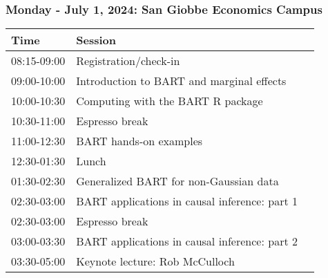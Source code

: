 \documentclass[11pt,pdftex,dvipsnames,usenames,helvetica]{beamer}
\begin{document}
\boldmath

\begin{comment}
\begin{frame}[fragile]
\frametitle{High-level outline: Bayesian Ensemble Learning}

\begin{enumerate}
\item Bayes' Theorem and Bayesianism
\item Machine/Statistical Learning and Ensembles with Binary Trees
\item Bayesian Additive Regression Trees: BART
\item Heteroskedastic BART 
\item R and BART packages
\item Continuous outcomes
\item Dichotomous/categorical outcomes
\item Time-to-event outcomes
\item Monotonic BART 
\item Brief review of recent BART results and extensions 
\end{enumerate}

\end{frame}
\end{comment}

\begin{frame}[fragile]
\frametitle{Monday - July 1, 2024: San Giobbe Economics Campus}
\begin{center}
\begin{tabular}{lll}
Time        & Session                            &  \\ \hline
08:15-09:00 & Registration/check-in            &  \\ \hline
09:00-10:00 & Introduction to BART and marginal effects               & \\  
10:00-10:30 & Computing with the BART R package               & \\ \hline
10:30-11:00 & Espresso break & \\ \hline
11:00-12:30 & BART hands-on examples             &  \\ \hline 
12:30-01:30 & Lunch  \\  \hline
01:30-02:30 & Generalized BART for non-Gaussian data             & \\
02:30-03:00 & BART applications in causal inference: part 1 & \\ \hline
02:30-03:00 & Espresso break                              & \\ \hline
03:00-03:30 & BART applications in causal inference: part 2 & \\ 
03:30-05:00 & Keynote lecture: Rob McCulloch           & \\ 
\end{tabular}
\end{center}
\end{frame}
\end{document}
